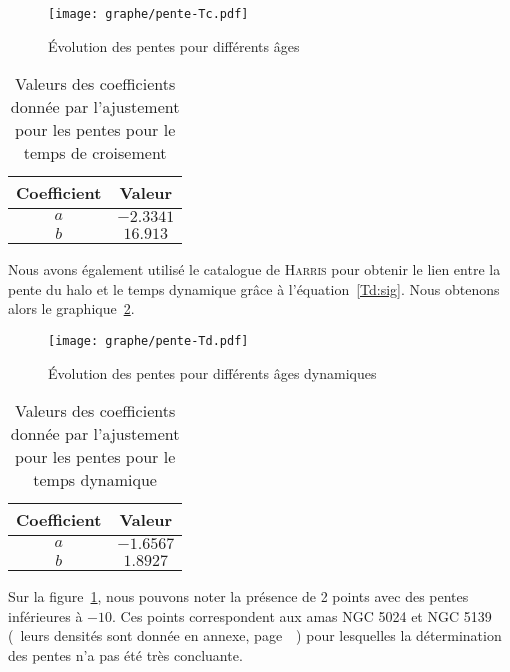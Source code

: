 	\begin{figure}[hbt!]
		\centering \texttt{[image: graphe/pente-Tc.pdf]}
		\caption{Évolution des pentes pour différents âges}
		\label{Pente-lin_dim}
	\end{figure}
	\begin{table}[hbt!]
		\begin{center}
			\begin{tabular}{|c|c|}%
				\hline
				Coefficient & Valeur \\ %
				\hline
				\hline
				$a$       &         $-2.3341$   \\ %
				\hline
				$b$       &         $16.913$   \\  %
				\hline
			\end{tabular}
		\end{center}
		\caption{Valeurs des coefficients donnée par l'ajustement pour les pentes pour le temps de croisement}
		\label{pente-lin-coeff_dim}
	\end{table}

	Nous avons également utilisé le catalogue de \textsc{Harris} pour obtenir le lien entre la pente du halo et le temps dynamique
	grâce à l'équation~\ref{Td:sig}. Nous obtenons alors le graphique~\ref{Pente-Td-lin}.
	\begin{figure}[hbt!]
		\centering \texttt{[image: graphe/pente-Td.pdf]}
		\caption{Évolution des pentes pour différents âges dynamiques}
		\label{Pente-Td-lin}
	\end{figure}
	\begin{table}[hbt!]
		\begin{center}
			\begin{tabular}{|c|c|}%
				\hline
				Coefficient & Valeur \\ %
				\hline
				\hline
				$a$       &        $-1.6567$   \\ %
				\hline
				$b$       &        $1.8927$     \\ %
				\hline
			\end{tabular}
		\end{center}
		\caption{Valeurs des coefficients donnée par l'ajustement pour les pentes pour le temps dynamique}
		\label{pente-Td-lin-coeff}
	\end{table}

	Sur la figure~\ref{Pente-lin_dim}, nous pouvons noter la présence de 2 points avec des pentes inférieures à $-10$. Ces points correspondent aux amas NGC 5024 et NGC 5139
	(~leurs densités sont donnée en annexe, page~\pageref{Graphe-bofbof}~) pour lesquelles la détermination des pentes n'a pas été très concluante.
	\FloatBarrier

